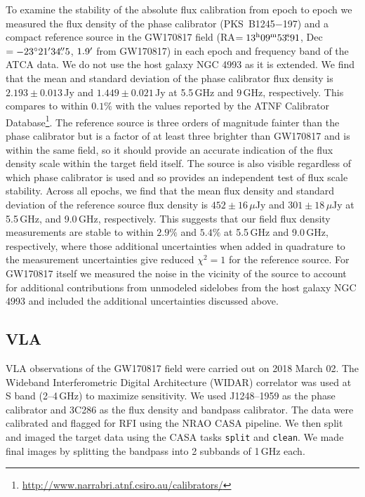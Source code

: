 To examine the stability of the absolute flux calibration from epoch to epoch we measured the flux density of the phase calibrator (PKS~B1245$-$197) and a compact reference source in the GW170817 field (RA$=13\mbox{$^{\mathrm h}$}09\mbox{$^{\mathrm m}$}53\mbox{$.\!\!^{\mathrm s}$}91$, Dec$=-23\mbox{$^\circ$}21\mbox{$^\prime$}34\mbox{$.\!\!^{\prime\prime}$}5$, $1.9\mbox{$^\prime$}$ from GW170817) in each epoch and frequency band of the ATCA data. We do not use the host galaxy NGC 4993 as it is extended. We find that the mean and standard deviation of the phase calibrator flux density is $2.193\pm0.013$\,Jy and $1.449\pm0.021$\,Jy at 5.5\,GHz and 9\,GHz, respectively. This compares to within $0.1\%$ with the values reported by the ATNF Calibrator Database\footnote{\url{http://www.narrabri.atnf.csiro.au/calibrators/}}.
The reference source is three orders of magnitude fainter than the phase calibrator but is a factor of at least three brighter than GW170817 and is within the same field, so it should provide an accurate indication of the flux density scale within the target field itself. The source is also visible regardless of which phase calibrator is used and so provides an independent test of flux scale stability. Across all epochs, we find that the mean flux density and standard deviation of the reference source flux density is $452\pm16\,\mu$Jy and $301\pm18\,\mu$Jy at 5.5\,GHz, and 9.0\,GHz, respectively. This suggests that our field flux density measurements are stable to within $2.9\%$ and $5.4\%$ at 5.5\,GHz and 9.0\,GHz, respectively, where those additional uncertainties when added in quadrature to the measurement uncertainties give reduced $\chi^2 = 1$ for the reference source. For GW170817 itself we measured the noise in the vicinity of the source to account for additional contributions from unmodeled sidelobes from the host galaxy NGC 4993 and included the additional uncertainties discussed above.


\subsection{VLA} \label{subsec:vla}
VLA observations of the GW170817 field were carried out on 2018 March 02. The Wideband Interferometric Digital Architecture (WIDAR) correlator was used at S band (2--4\,GHz) to maximize sensitivity. We used J1248--1959 as the phase calibrator and 3C286 as the flux density and bandpass calibrator. The data were calibrated and flagged for RFI using the NRAO {CASA} \citep{2007ASPC..376..127M} pipeline. We then split and imaged the target data using the CASA tasks {\tt split} and {\tt clean}. We made final images by splitting the bandpass into 2 subbands of 1\,GHz each.


